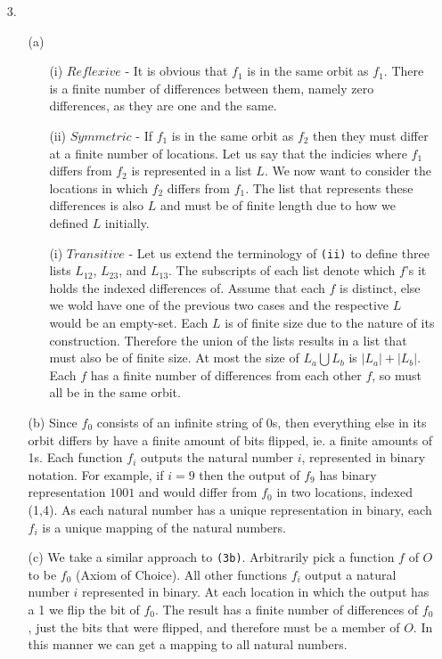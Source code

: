 \documentclass{article}
\begin{document}
\begin{enumerate}
\item[3.]
	\begin{enumerate}
	\item[(a)]
		\begin{enumerate}
		\item[(i)]
			$Reflexive$ - It is obvious that $f_1$ is in the same orbit as $f_1$. There is a finite number of differences between them, namely zero differences, as they are one and the same.
		\item[(ii)]
			$Symmetric$ - If $f_1$ is in the same orbit as $f_2$ then they must differ at a finite number of locations. Let us say that the indicies where $f_1$ differs from $f_2$ is represented in a list $L$. We now want to consider the locations in which $f_2$ differs from $f_1$. The list that represents these differences is also $L$ and must be of finite length due to how we defined $L$ initially.
		\item[(i)]
			$Transitive$ - Let us extend the terminology of \texttt{(ii)} to define three lists $L_{12}$, $L_{23}$, and $L_{13}$. The subscripts of each list denote which $f$'s it holds the indexed differences of. Assume that each $f$ is distinct, else we wold have one of the previous two cases and the respective $L$ would be an empty-set. Each $L$ is of finite size due to the nature of its construction. Therefore the union of the lists results in a list that must also be of finite size. At most the size of $L_a \bigcup L_b$ is $|L_a| + |L_b|$. Each $f$ has a finite number of differences from each other $f$, so must all be in the same orbit.
		\end{enumerate}
	\item[(b)]
		Since $f_0$ consists of an infinite string of 0s, then everything else in its orbit differs by have a finite amount of bits flipped, ie. a finite amounts of 1s. Each function $f_i$ outputs the natural number $i$, represented in binary notation. For example, if $i=9$ then the output of $f_9$ has binary representation $1001$ and would differ from $f_0$ in two locations, indexed (1,4). As each natural number has a unique representation in binary, each $f_i$ is a unique mapping of the natural numbers.
	\item[(c)]
		We take a similar approach to \texttt{(3b)}. Arbitrarily pick a function $f$ of $O$ to be $f_0$ (Axiom of Choice). All other functions $f_i$ output a natural number $i$ represented in binary. At each location in which the output has a 1 we flip the bit of $f_0$. The result has a finite number of differences of $f_0$, just the bits that were flipped, and therefore must be a member of $O$. In this manner we can get a mapping to all natural numbers.
	\end{enumerate}
\end{enumerate}
\end{document}
